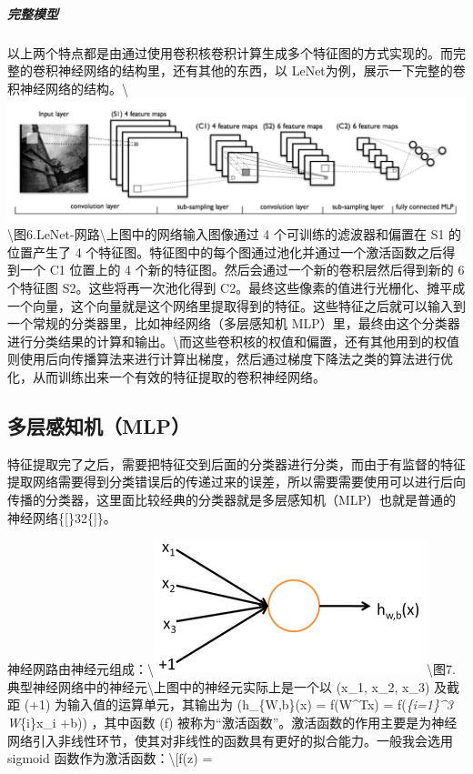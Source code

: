 \subparagraph{完整模型}\label{ux5b8cux6574ux6a21ux578b}

以上两个特点都是由通过使用卷积核卷积计算生成多个特征图的方式实现的。而完整的卷积神经网络的结构里，还有其他的东西，以
LeNet为例，展示一下完整的卷积神经网络的结构。\textbackslash{}\includegraphics{picture/lenet.png}\textbackslash{}图6.LeNet-网路\textbackslash{}上图中的网络输入图像通过
4 个可训练的滤波器和偏置在 S1 的位置产生了 4
个特征图。特征图中的每个图通过池化并通过一个激活函数之后得到一个 C1
位置上的 4 个新的特征图。然后会通过一个新的卷积层然后得到新的 6 个特征图
S2。这些将再一次池化得到
C2。最终这些像素的值进行光栅化、摊平成一个向量，这个向量就是这个网络里提取得到的特征。这些特征之后就可以输入到一个常规的分类器里，比如神经网络（多层感知机
MLP）里，最终由这个分类器进行分类结果的计算和输出。\textbackslash{}而这些卷积核的权值和偏置，还有其他用到的权值则使用后向传播算法来进行计算出梯度，然后通过梯度下降法之类的算法进行优化，从而训练出来一个有效的特征提取的卷积神经网络。

\subsection{多层感知机（MLP）}\label{ux591aux5c42ux611fux77e5ux673amlp}

特征提取完了之后，需要把特征交到后面的分类器进行分类，而由于有监督的特征提取网络需要得到分类错误后的传递过来的误差，所以需要需要使用可以进行后向传播的分类器，这里面比较经典的分类器就是多层感知机（MLP）也就是普通的神经网络\{{[}\}32\{{]}\}。

神经网路由神经元组成：\textbackslash{}\includegraphics{picture/single-neuron.png}\textbackslash{}图7.典型神经网络中的神经元\textbackslash{}上图中的神经元实际上是一个以
(x\_1, x\_2, x\_3) 及截距 (+1) 为输入值的运算单元，其输出为
(h\_\{W,b\}(x) = f(W\^{}Tx) = f(\sum\emph{\{i=1\}\^{}3 W}\{i\}x\_i +b))
，其中函数 (f)
被称为``激活函数''。激活函数的作用主要是为神经网络引入非线性环节，使其对非线性的函数具有更好的拟合能力。一般我会选用
sigmoid 函数作为激活函数：\textbackslash{}{[}f(z) =
\frac{1}{1+\exp(-z)}{]}

